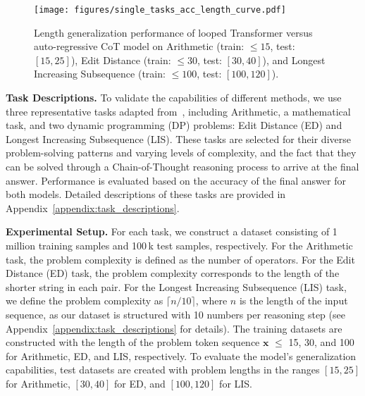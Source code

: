 \begin{figure*}[htbp]
    \centering
    \texttt{[image: figures/single\_tasks\_acc\_length\_curve.pdf]}
    \vspace{-18pt}
    \caption{Length generalization performance of looped Transformer versus auto-regressive CoT model on Arithmetic (train: $\leq15$, test: $[15, 25]$), Edit Distance (train: $\leq30$, test: $[30, 40]$), and Longest Increasing Subsequence (train: $\leq100$, test: $[100, 120]$). } 
    \label{fig:single_tasks}
\end{figure*}

\textbf{Task Descriptions.} To validate the capabilities of different methods, we use three representative tasks adapted from~\citet{feng2024towards}, including Arithmetic, a mathematical task, and two dynamic programming (DP) problems: Edit Distance (ED) and Longest Increasing Subsequence (LIS). These tasks are selected for their diverse problem-solving patterns and varying levels of complexity, and the fact that they can be solved through a Chain-of-Thought reasoning process to arrive at the final answer. Performance is evaluated based on the accuracy of the final answer for both models. Detailed descriptions of these tasks are provided in Appendix~\ref{appendix:task_descriptions}.

\textbf{Experimental Setup.}
For each task, we construct a dataset consisting of 1 million training samples and 100\,k test samples, respectively. For the Arithmetic task, the problem complexity is defined as the number of operators. For the Edit Distance (ED) task, the problem complexity corresponds to the length of the shorter string in each pair. For the Longest Increasing Subsequence (LIS) task, we define the problem complexity as $\lceil n / 10 \rceil$, where $n$ is the length of the input sequence, as our dataset is structured with 10 numbers per reasoning step (see Appendix~\ref{appendix:task_descriptions} for details). The training datasets are constructed with the length of the problem token sequence  \(\bm{x}\) $\leq$ 15, 30, and 100 for Arithmetic, ED, and LIS, respectively. To evaluate the model's generalization capabilities, test datasets are created with problem lengths in the ranges $[15, 25]$ for Arithmetic, $[30, 40]$ for ED, and $[100, 120]$ for LIS. 

